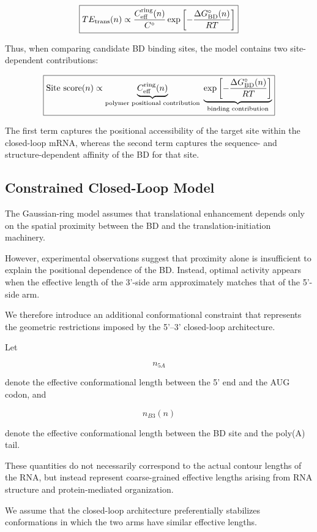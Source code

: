 \documentclass{article}
\begin{document}
\[
\boxed{
TE_{\rm trans}(n)
\propto
\frac{
C_{\rm eff}^{\rm ring}(n)
}{
C^\circ
}
\exp\left[
-\frac{\Delta G_{\rm BD}^{\circ}(n)}
{RT}
\right]
}
\]

Thus, when comparing candidate BD binding sites, the model contains two site-dependent contributions:

\[
\boxed{
\text{Site score}(n)
\propto
\underbrace{
C_{\rm eff}^{\rm ring}(n)
}_{\text{polymer positional contribution}}
\;
\underbrace{
\exp\left[
-\frac{\Delta G_{\rm BD}^{\circ}(n)}
{RT}
\right]
}_{\text{binding contribution}}
}
\]

The first term captures the positional accessibility of the target site within the closed-loop mRNA, whereas the second term captures the sequence- and structure-dependent affinity of the BD for that site.

\subsection{Constrained Closed-Loop Model}

The Gaussian-ring model assumes that translational enhancement
depends only on the spatial proximity between the BD and the
translation-initiation machinery.

However, experimental observations suggest that proximity alone
is insufficient to explain the positional dependence of the BD.
Instead, optimal activity appears when the effective length of
the 3'-side arm approximately matches that of the 5'-side arm.

We therefore introduce an additional conformational constraint
that represents the geometric restrictions imposed by the
5'--3' closed-loop architecture.

Let

\[
n_{5A}
\]

denote the effective conformational length between the 5' end
and the AUG codon, and

\[
n_{B3}(n)
\]

denote the effective conformational length between the BD site
and the poly(A) tail.

These quantities do not necessarily correspond to the actual
contour lengths of the RNA, but instead represent coarse-grained
effective lengths arising from RNA structure and protein-mediated
organization.

We assume that the closed-loop architecture preferentially
stabilizes conformations in which the two arms have similar
effective lengths.
\end{document}
